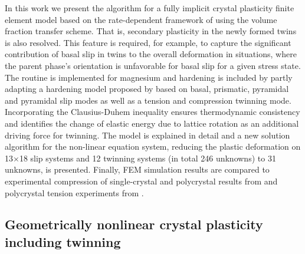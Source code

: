 In this work we present the algorithm for a fully implicit crystal plasticity finite element model based on the rate-dependent framework of  using the volume fraction transfer scheme. That is, secondary plasticity in the newly formed twins is also resolved. This feature is required, for example, to capture the significant contribution of basal slip in twins to the overall deformation in situations, where the parent phase's orientation is unfavorable for basal slip for a given stress state. The routine is implemented for magnesium and hardening is included by partly adapting a hardening model proposed by  based on basal, prismatic, pyramidal \pyra and pyramidal \pyrac slip modes as well as a tension and compression twinning mode. Incorporating the Clausius-Duhem inequality ensures thermodynamic consistency and identifies the change of elastic energy due to lattice rotation as an additional driving force for twinning. The model is explained in detail and a new solution algorithm for the non-linear equation system, reducing the plastic deformation on 13$\times$18 slip systems and 12 twinning systems (in total 246 unknowns) to 31 unknowns, is presented. Finally, FEM simulation results are compared to experimental compression of single-crystal and polycrystal results from  and polycrystal tension experiments from .  


\subsection{Geometrically nonlinear crystal plasticity including twinning}
